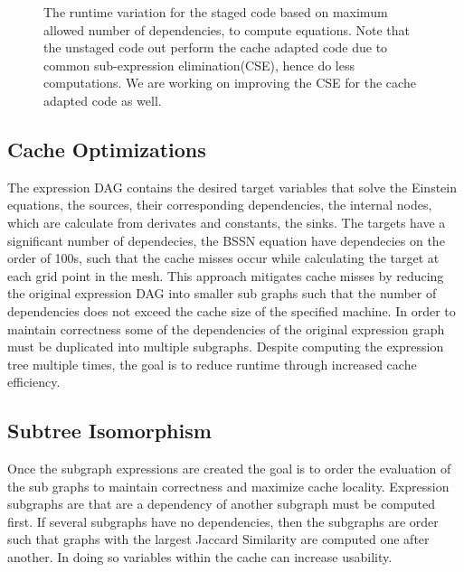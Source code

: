 \documentclass[sigconf,]{acmart}
\begin{document}
  \begin{figure}
    \caption{The runtime variation for the staged code based on maximum allowed number of dependencies, to compute \BSSN equations. Note that the unstaged code out perform the cache adapted code due to common sub-expression elimination(CSE), hence do less computations. We are working on improving the CSE for the cache adapted code as well. }
  	\label{fig:runtime_results}
\end{figure}

\subsection{Cache Optimizations}
The expression DAG contains the desired target variables that solve the Einstein equations, the sources, their corresponding dependencies, the internal nodes, which are calculate from derivates and constants, the sinks. The targets have a significant number of dependecies, the BSSN equation have dependecies on the order of 100s, such that the cache misses occur while calculating the target at each grid point in the mesh. This approach mitigates cache misses by reducing the original expression DAG into smaller sub graphs such that the number of dependencies does not exceed the cache size of the specified machine. In order to maintain correctness some of the dependencies of the original expression graph must be duplicated into multiple subgraphs. Despite computing the expression tree multiple times, the goal is to reduce runtime through increased cache efficiency.

\subsection{Subtree Isomorphism}
Once the subgraph expressions are created the goal is to order the evaluation of the sub graphs to maintain correctness and maximize cache locality. Expression subgraphs are that are a dependency of another subgraph must be computed first. If several subgraphs have no dependencies, then the subgraphs are order such that graphs with the largest Jaccard Similarity are computed one after another. In doing so variables within the cache can increase usability.  
\end{document}
